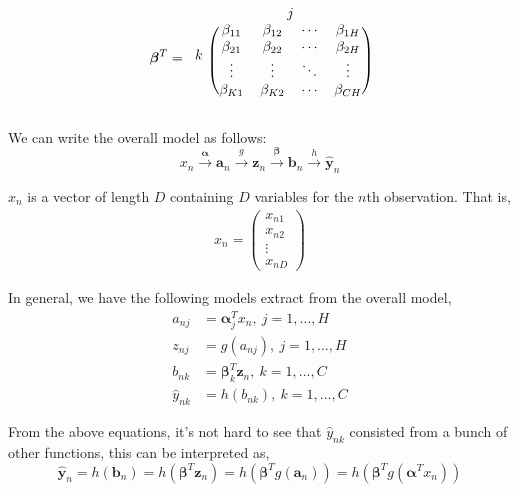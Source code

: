 \documentclass[12pt,a4paper]{article}%
\theoremstyle{definition}
\theoremstyle{plain}
\numberwithin{equation}{section}
\begin{document}
\begin{equation*}
\boldsymbol{\beta}^{T} = 
\begin{blockarray}{ccccc}
  & \multicolumn{4}{c}{$j$}  \\
\begin{block}{c(cccc)}
\multirow{4}{*}{$k$}  & \beta_{11} & \beta_{12} & \cdots & \beta_{1H} \\
  			          & \beta_{21} & \beta_{22} & \cdots & \beta_{2H} \\
 		  			  & \vdots      & \vdots      & \ddots & \vdots  \\
			          & \beta_{K1} & \beta_{K2} & \cdots & \beta_{CH} \\
\end{block}
\end{blockarray}
\end{equation*}


We can write the overall model as follows:
\begin{equation*}
x_{n} \xrightarrow{\boldsymbol{\alpha}} \mathbf{a}_{n} \xrightarrow{g} \mathbf{z}_{n} \xrightarrow{\boldsymbol{\beta}} \mathbf{b}_{n} \xrightarrow{h} \hat{\mathbf{y}}_{n}
\end{equation*}

$x_{n}$ is a vector of length $D$ containing $D$ variables for the $n$th observation. That is,
\begin{gather}
x_{n} = \begin{pmatrix}
  x_{n1} \\
  x_{n2} \\
  \vdots \\
  x_{nD} 
 \end{pmatrix}
\end{gather}

In general, we have the following models extract from the overall model, 
\begin{align*}
a_{nj} &= \boldsymbol{\alpha}_{j}^{T} x_{n}, ~ j = 1, \dots, H \\
z_{nj} &= g(a_{nj}),            ~ j = 1, \dots, H \\
b_{nk} &= \boldsymbol{\beta}_{k}^{T} \mathbf{z}_{n},  ~ k = 1, \dots, C \\
\hat{y}_{nk} &= h(b_{nk}), ~ k=1,\dots, C
\end{align*}

From the above equations, it's not hard to see that $\hat{y}_{nk}$ consisted from a bunch of other functions, this can be interpreted as,
\begin{equation}
\hat{\mathbf{y}}_{n} = h(\mathbf{b}_{n}) = h(\boldsymbol{\beta}^{T} \mathbf{z}_{n}) = h(\boldsymbol{\beta}^{T} g( \mathbf{a}_{n})) = h(\boldsymbol{\beta}^{T} g(\boldsymbol{\alpha}^{T} x_{n}))
\end{equation}
\end{document}
